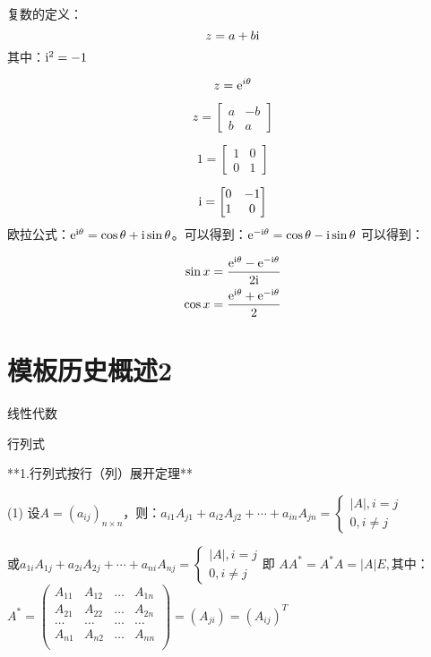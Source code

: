 复数的定义：
\[ z=a+b\mathrm{i} \]
其中：$\mathrm{i}^2=-1$

\[ z=\mathrm{e}^{i\theta} \]

\[ z=\begin{bmatrix}
        a & -b \\
        b & a
    \end{bmatrix} \]

\[ 1 = \begin{bmatrix}
        1 & 0 \\
        0 & 1
    \end{bmatrix} \]

\[ \mathrm{i}=\begin{bmatrix}
        0 & -1 \\
        1 & 0
    \end{bmatrix} \]
欧拉公式：$\mathrm{e}^{\mathrm{i}\theta}=\cos \theta + \mathrm{i} \sin \theta$。可以得到：$\mathrm{e}^{\mathrm{-i}\theta}=\cos \theta - \mathrm{i} \sin \theta$
可以得到：

\begin{align*}
    \sin x & = \frac{\mathrm{e}^{\mathrm{i}\theta}-\mathrm{e}^{\mathrm{-i}\theta}}{2\mathrm{i}} \\
    \cos x & = \frac{\mathrm{e}^{\mathrm{i}\theta}+\mathrm{e}^{\mathrm{-i}\theta}}{2}
\end{align*}

\section{模板历史概述2}

线性代数

行列式

**1.行列式按行（列）展\cite{cn3}开定理**

(1) 设$A = ( a_{{ij}} )_{n \times n}$，则：$a_{i1}A_{j1} +a_{i2}A_{j2} + \cdots + a_{{in}}A_{{jn}} = \begin{cases}|A|,i=j\\ 0,i \neq j\end{cases}$

或$a_{1i}A_{1j} + a_{2i}A_{2j} + \cdots + a_{{ni}}A_{{nj}} = \begin{cases}|A|,i=j\\ 0,i \neq j\end{cases}$即 $AA^{*} = A^{*}A = \left| A \right|E,$其中：$A^{*} = \begin{pmatrix} A_{11} & A_{12} & \ldots & A_{1n} \\ A_{21} & A_{22} & \ldots & A_{2n} \\ \ldots & \ldots & \ldots & \ldots \\ A_{n1} & A_{n2} & \ldots & A_{{nn}} \\ \end{pmatrix} = (A_{{ji}}) = {(A_{{ij}})}^{T}$


